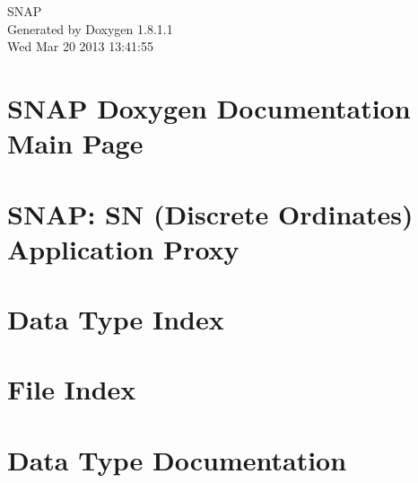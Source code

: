 \documentclass{book}
\begin{document}
\hypersetup{pageanchor=false,citecolor=blue}
\begin{titlepage}
\vspace*{7cm}
\begin{center}
{\Large S\-N\-A\-P }\\
\vspace*{1cm}
{\large Generated by Doxygen 1.8.1.1}\\
\vspace*{0.5cm}
{\small Wed Mar 20 2013 13:41:55}\\
\end{center}
\end{titlepage}
\clearemptydoublepage
{}
\tableofcontents
\clearemptydoublepage
{}
\hypersetup{pageanchor=true,citecolor=blue}
\chapter{S\-N\-A\-P Doxygen Documentation Main Page}
\label{index}\hypertarget{index}{}
\chapter{S\-N\-A\-P\-: S\-N (Discrete Ordinates) Application Proxy}
\label{md_README}
\hypertarget{md_README}{}

\chapter{Data Type Index}

\chapter{File Index}

\chapter{Data Type Documentation}



























\end{document}

